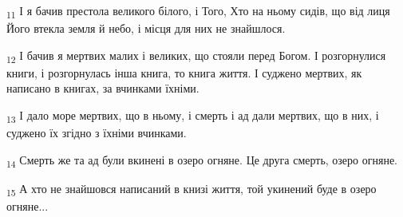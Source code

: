 \begin{tcolorbox}
\textsubscript{11} І я бачив престола великого білого, і Того, Хто на ньому сидів, що від лиця Його втекла земля й небо, і місця для них не знайшлося.
\end{tcolorbox}
\begin{tcolorbox}
\textsubscript{12} І бачив я мертвих малих і великих, що стояли перед Богом. І розгорнулися книги, і розгорнулась інша книга, то книга життя. І суджено мертвих, як написано в книгах, за вчинками їхніми.
\end{tcolorbox}
\begin{tcolorbox}
\textsubscript{13} І дало море мертвих, що в ньому, і смерть і ад дали мертвих, що в них, і суджено їх згідно з їхніми вчинками.
\end{tcolorbox}
\begin{tcolorbox}
\textsubscript{14} Смерть же та ад були вкинені в озеро огняне. Це друга смерть, озеро огняне.
\end{tcolorbox}
\begin{tcolorbox}
\textsubscript{15} А хто не знайшовся написаний в книзі життя, той укинений буде в озеро огняне...
\end{tcolorbox}
